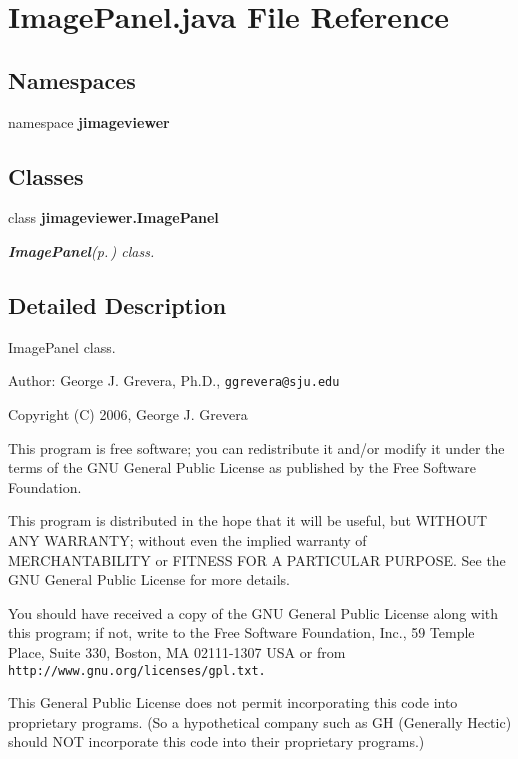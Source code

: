\section{Image\-Panel.java File Reference}
\label{_image_panel_8java}
\subsection*{Namespaces}
\begin{CompactItemize}
\item 
namespace {\bf jimageviewer}
\end{CompactItemize}
\subsection*{Classes}
\begin{CompactItemize}
\item 
class {\bf jimageviewer.Image\-Panel}
\begin{CompactList}\small\item\em {\bf Image\-Panel}{\rm (p.\,\pageref{classjimageviewer_1_1_image_panel})} class. \item\end{CompactList}\end{CompactItemize}


\subsection{Detailed Description}
Image\-Panel class.

\begin{Desc}
\item[Author:]George J. Grevera, Ph.D., {\tt ggrevera@sju.edu}\end{Desc}
Copyright (C) 2006, George J. Grevera

This program is free software; you can redistribute it and/or modify it under the terms of the GNU General Public License as published by the Free Software Foundation.

This program is distributed in the hope that it will be useful, but WITHOUT ANY WARRANTY; without even the implied warranty of MERCHANTABILITY or FITNESS FOR A PARTICULAR PURPOSE. See the GNU General Public License for more details.

You should have received a copy of the GNU General Public License along with this program; if not, write to the Free Software Foundation, Inc., 59 Temple Place, Suite 330, Boston, MA 02111-1307 USA or from {\tt http://www.gnu.org/licenses/gpl.txt.}

This General Public License does not permit incorporating this code into proprietary programs. (So a hypothetical company such as GH (Generally Hectic) should NOT incorporate this code into their proprietary programs.) 